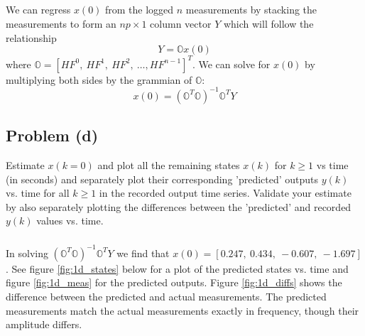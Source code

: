 \documentclass[11pt]{article}
\begin{document}
\subparagraph*{}
We can regress $x(0)$ from the logged $n$ measurements by stacking the measurements to form an $np\times1$ column vector $Y$ which will follow the relationship
\begin{equation*}
	Y = \mathbb{O}x(0)
\end{equation*}
where $\mathbb{O}=[HF^0,\ HF^1,\ HF^2,\ \dots, HF^{n-1}]^T$. We can solve for $x(0)$ by multiplying both sides by the grammian of $\mathbb{O}$:
\begin{equation*}
	x(0) = (\mathbb{O}^T\mathbb{O})^{-1}\mathbb{O}^TY
\end{equation*}

\subsection*{Problem (d)}
Estimate $x(k=0)$ and plot all the remaining states $x(k)$ for $k\geq 1$ vs time (in seconds) and separately plot their corresponding 'predicted' outputs $y(k)$ vs. time for all $k\geq 1$ in the recorded output time series. Validate your estimate by also separately plotting the differences between the 'predicted' and recorded $y(k)$ values vs. time.

\subparagraph*{}
In solving $(\mathbb{O}^T\mathbb{O})^{-1}\mathbb{O}^TY$ we find that $x(0)=[0.247,\ 0.434,\ -0.607,\ -1.697]$. See figure \ref{fig:1d_states} below for a plot of the predicted states vs. time and figure \ref{fig:1d_meas} for the predicted outputs. Figure \ref{fig:1d_diffs} shows the difference between the predicted and actual measurements. The predicted measurements match the actual measurements exactly in frequency, though their amplitude differs.
\end{document}
